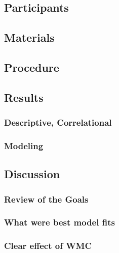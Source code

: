 \documentclass[]{book}
\theoremstyle{definition}
\theoremstyle{definition}
\theoremstyle{definition}
\theoremstyle{remark}
\begin{document}
\hypertarget{participants}{%
\subsection{Participants}\label{participants}}

\hypertarget{materials}{%
\subsection{Materials}\label{materials}}

\hypertarget{procedure}{%
\subsection{Procedure}\label{procedure}}

\hypertarget{results}{%
\subsection{Results}\label{results}}

\hypertarget{descriptive-correlational}{%
\subsubsection{Descriptive,
Correlational}\label{descriptive-correlational}}

\hypertarget{modeling}{%
\subsubsection{Modeling}\label{modeling}}

\hypertarget{discussion}{%
\subsection{Discussion}\label{discussion}}

\hypertarget{review-of-the-goals}{%
\subsubsection{Review of the Goals}\label{review-of-the-goals}}

\hypertarget{what-were-best-model-fits}{%
\subsubsection{What were best model
fits}\label{what-were-best-model-fits}}

\hypertarget{clear-effect-of-wmc}{%
\subsubsection{Clear effect of WMC}\label{clear-effect-of-wmc}}
\end{document}
